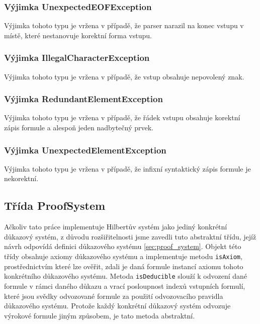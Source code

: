 \documentclass[thesis=B,czech,hidelinks]{thesis}[2012/06/26]
\begin{document}
\subsubsection{Výjimka UnexpectedEOFException}

Výjimka tohoto typu je vržena v případě, že parser narazil na konec vstupu v místě, které nestanovuje korektní forma vstupu.

\subsubsection{Výjimka IllegalCharacterException}

Výjimka tohoto typu je vržena v případě, že vstup obsahuje nepovolený znak.

\subsubsection{Výjimka RedundantElementException}

Výjimka tohoto typu je vržena v případě, že řádek vstupu obsahuje korektní zápis formule a alespoň jeden nadbytečný prvek.

\subsubsection{Výjimka UnexpectedElementException}

Výjimka tohoto typu je vržena v případě, že infixní syntaktický zápis formule je nekorektní.

\subsection{Třída ProofSystem}

Ačkoliv tato práce implementuje Hilbertův systém jako jediný konkrétní důkazový systém, z důvodu rozšiřitelnosti jsme zavedli tuto abstraktní třídu, jejíž návrh odpovídá definici důkazového systému \ref{sec:proof_system}. Objekt této třídy obsahuje axiomy důkazového systému a implementuje metodu \texttt{isAxiom}, prostřednictvím které lze ověřit, zdali je daná formule instancí axiomu tohoto konkrétního důkazového systému. Metoda \texttt{isDeducible} slouží k odvození dané formule v rámci daného důkazu a vrací posloupnost indexů vstupních formulí, které jsou svědky odvozované formule za použití odvozovacího pravidla důkazového systému. Protože každý konkrétní důkazový systém odvozuje výrokové formule jiným způsobem, je tato metoda abstraktní.
\end{document}

